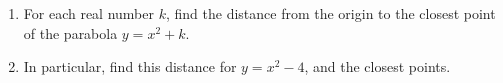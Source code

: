 \begin{enumerate}
\item[(a)] For each real number $k$, find the distance from the origin to the closest point of the parabola $y=x^2+k$.
\item[(b)] In particular, find this distance for $y=x^2-4$, and the closest points.
\end{enumerate}

